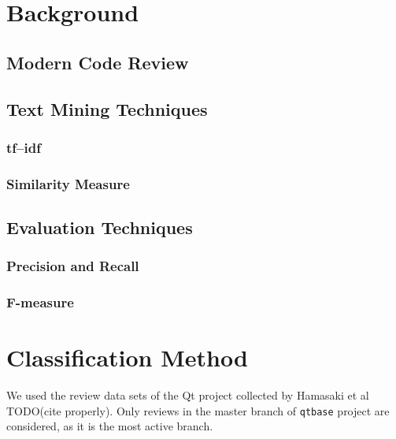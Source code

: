 \documentclass[conference]{IEEEtran}
\begin{document}
 



\section{Background}
\subsection{Modern Code Review}
\subsection{Text Mining Techniques}
\subsubsection{tf--idf}
\subsubsection{Similarity Measure}
\subsection{Evaluation Techniques}
\subsubsection{Precision and Recall}
\subsubsection{F-measure}


\section{Classification Method}

We used the review data sets of the Qt project collected by Hamasaki et al TODO(cite properly).
Only reviews in the master branch of \texttt{qtbase} project are considered,
as it is the most active branch.
\end{document}
